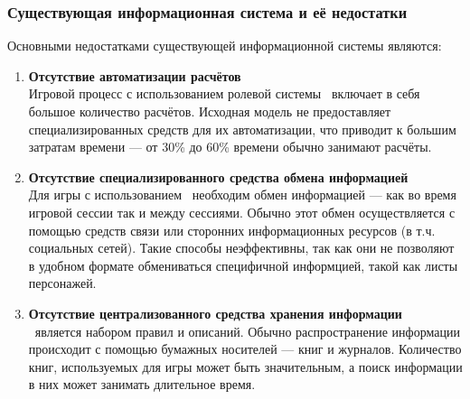 \subsubsection{Существующая информационная система и её недостатки}


Основными недостатками существующей информационной системы являются:
\begin{enumerate}
\item \textbf{Отсутствие автоматизации расчётов}\\
Игровой процесс с использованием ролевой системы \dnd\ включает в себя большое количество расчётов. Исходная модель не предоставляет специализированных средств для их автоматизации, что приводит к большим затратам времени --- от 30\% до 60\% времени обычно занимают расчёты.
\item \textbf{Отсутствие специализированного средства обмена информацией}\\
Для игры с использованием \dnd\ необходим обмен информацией --- как во время игровой сессии так и между сессиями. Обычно этот обмен осуществляется с помощью средств связи или сторонних информационных ресурсов (в т.ч. социальных сетей). Такие способы неэффективны, так как они не позволяют в удобном формате обмениваться специфичной информцией, такой как листы персонажей.
\item \textbf{Отсутствие централизованного средства хранения информации}\\
\dnd\ является набором правил и описаний. Обычно распространение информации происходит с помощью бумажных носителей --- книг и журналов. Количество книг, используемых для игры может быть значительным, а поиск информации в них может занимать длительное время.
\end{enumerate}
